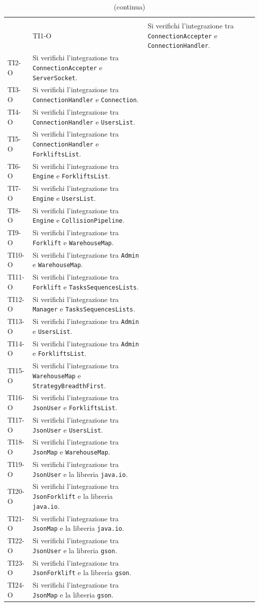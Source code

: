 		\begin{longtable}{ >{\centering}p{} >{}p{}}
		
		
		\caption{Riepilogo Test di Integrazione}\\
		\hline
		\rowcolorhead
		 & \headertitle{Descrizione}
		\endfirsthead
		\caption[]{(continua)}\\
		\rowcolorhead
		 & \headertitle{Descrizione}
		\endhead
		
		
		
		TI1-O & Si verifichi l'integrazione tra \texttt{ConnectionAccepter} e \texttt{ConnectionHandler}. \tabularnewline
		TI2-O & Si verifichi l'integrazione tra \texttt{ConnectionAccepter} e \texttt{ServerSocket}. \tabularnewline
		TI3-O & Si verifichi l'integrazione tra \texttt{ConnectionHandler} e \texttt{Connection}. \tabularnewline
		TI4-O & Si verifichi l'integrazione tra \texttt{ConnectionHandler} e \texttt{UsersList}. \tabularnewline
		TI5-O & Si verifichi l'integrazione tra \texttt{ConnectionHandler} e \texttt{ForkliftsList}. \tabularnewline
		TI6-O & Si verifichi l'integrazione tra \texttt{Engine} e \texttt{ForkliftsList}. \tabularnewline
		TI7-O & Si verifichi l'integrazione tra \texttt{Engine} e \texttt{UsersList}. \tabularnewline
		TI8-O & Si verifichi l'integrazione tra \texttt{Engine} e \texttt{CollisionPipeline}. \tabularnewline
		TI9-O & Si verifichi l'integrazione tra \texttt{Forklift} e \texttt{WarehouseMap}. \tabularnewline
		TI10-O & Si verifichi l'integrazione tra \texttt{Admin} e \texttt{WarehouseMap}. \tabularnewline
		TI11-O & Si verifichi l'integrazione tra \texttt{Forklift} e \texttt{TasksSequencesLists}. \tabularnewline
		TI12-O & Si verifichi l'integrazione tra \texttt{Manager} e \texttt{TasksSequencesLists}. \tabularnewline
		TI13-O & Si verifichi l'integrazione tra \texttt{Admin} e \texttt{UsersList}. \tabularnewline
		TI14-O & Si verifichi l'integrazione tra \texttt{Admin} e \texttt{ForkliftsList}. \tabularnewline
		TI15-O & Si verifichi l'integrazione tra \texttt{WarehouseMap} e \texttt{StrategyBreadthFirst}. \tabularnewline
		TI16-O & Si verifichi l'integrazione tra \texttt{JsonUser} e \texttt{ForkliftsList}. \tabularnewline
		TI17-O & Si verifichi l'integrazione tra \texttt{JsonUser} e \texttt{UsersList}. \tabularnewline
		TI18-O & Si verifichi l'integrazione tra \texttt{JsonMap} e \texttt{WarehouseMap}. \tabularnewline
		TI19-O & Si verifichi l'integrazione tra \texttt{JsonUser} e la libreria \texttt{java.io}. \tabularnewline
		TI20-O & Si verifichi l'integrazione tra \texttt{JsonForklift} e la libreria \texttt{java.io}. \tabularnewline
		TI21-O & Si verifichi l'integrazione tra \texttt{JsonMap} e la libreria \texttt{java.io}. \tabularnewline
		TI22-O & Si verifichi l'integrazione tra \texttt{JsonUser} e la libreria \texttt{gson}. \tabularnewline
		TI23-O & Si verifichi l'integrazione tra \texttt{JsonForklift} e la libreria \texttt{gson}. \tabularnewline
		TI24-O & Si verifichi l'integrazione tra \texttt{JsonMap} e la libreria \texttt{gson}. \tabularnewline
	\end{longtable}

